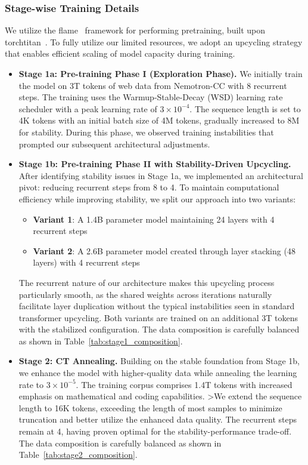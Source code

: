 \documentclass[]{bytedance_seed}
\newcommand{\1}{\mathbf{1}}
\begin{document}
\subsubsection{Stage-wise Training Details}

We utilize the flame~\cite{zhang2025flame} framework for performing pretraining, built upon torchtitan~\cite{liang2025torchtitan}. To fully utilize our limited resources, we adopt an upcycling strategy that enables efficient scaling of model capacity during training.

\begin{itemize}[itemsep=0.0pt,topsep=0pt,leftmargin=*]
    \item \textbf{Stage 1a: Pre-training Phase I (Exploration Phase).} We initially train the model on 3T tokens of web data from Nemotron-CC with 8 recurrent steps. The training uses the Warmup-Stable-Decay (WSD) learning rate scheduler with a peak learning rate of $3 \times 10^{-4}$. The sequence length is set to 4K tokens with an initial batch size of 4M tokens, gradually increased to 8M for stability. During this phase, we observed training instabilities that prompted our subsequent architectural adjustments.
    \item \textbf{Stage 1b: Pre-training Phase II with Stability-Driven Upcycling.} After identifying stability issues in Stage 1a, we implemented an architectural pivot: reducing recurrent steps from 8 to 4. To maintain computational efficiency while improving stability, we split our approach into two variants:
    \begin{itemize}
        \item \textbf{Variant 1}: A 1.4B parameter model maintaining 24 layers with 4 recurrent steps
        \item \textbf{Variant 2}: A 2.6B parameter model created through layer stacking (48 layers) with 4 recurrent steps
    \end{itemize}
    The recurrent nature of our architecture makes this upcycling process particularly smooth, as the shared weights across iterations naturally facilitate layer duplication without the typical instabilities seen in standard transformer upcycling. Both variants are trained on an additional 3T tokens with the stabilized configuration. The data composition is carefully balanced as shown in Table~\ref{tab:stage1_composition}.
    
    \item \textbf{Stage 2: CT Annealing.} Building on the stable foundation from Stage 1b, we enhance the model with higher-quality data while annealing the learning rate to $3 \times 10^{-5}$. The training corpus comprises 1.4T tokens with increased emphasis on mathematical and coding capabilities. >We extend the sequence length to 16K tokens, exceeding the length of most samples to minimize truncation and better utilize the enhanced data quality. The recurrent steps remain at 4, having proven optimal for the stability-performance trade-off. The data composition is carefully balanced as shown in Table~\ref{tab:stage2_composition}.
    

\end{itemize}
\end{document}
